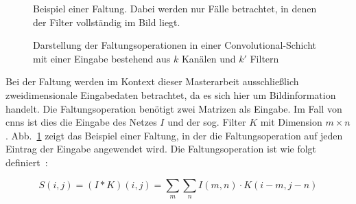 \begin{figure}[p]
    \caption{Beispiel einer Faltung. Dabei werden nur Fälle betrachtet, in denen der Filter vollständig im Bild liegt.~\cite{goodfellowDeepLearningUmfassende2018}}
    \label{fig:conv}
\end{figure}

\begin{figure}[p]
    \centering
    \resizebox*{\textwidth}{!}{}
    \caption{Darstellung der Faltungsoperationen in einer Convolutional-Schicht mit einer Eingabe bestehend aus $k$ Kanälen und $k'$ Filtern}
    \label{fig:conv_layer}
\end{figure}

Bei der Faltung werden im Kontext dieser Masterarbeit ausschließlich zweidimensionale Eingabedaten betrachtet, da es sich hier um Bildinformation handelt. Die Faltungsoperation benötigt zwei Matrizen als Eingabe. Im Fall von \glspl{cnn} ist dies die Eingabe des Netzes $I$ und der sog. Filter $K$ mit Dimension $m \times n$. Abb.~\ref{fig:conv} zeigt das Beispiel einer Faltung, in der die Faltungsoperation auf jeden Eintrag der Eingabe angewendet wird. Die Faltungsoperation ist wie folgt definiert~\cite[S. 371]{goodfellowDeepLearningUmfassende2018}:

\begin{equation}
    S(i,j) = (I * K)(i,j) = \sum_m \sum_n I(m,n) \cdot K(i-m, j-n)
\end{equation}




